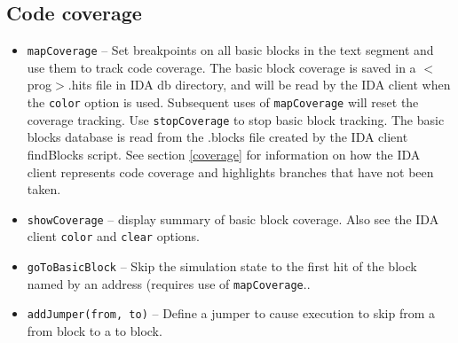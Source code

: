 \documentclass[titlepage]{article}
\begin{document}
\subsection{Code coverage}
\begin{itemize}
\item {\tt mapCoverage} -- Set breakpoints on all basic blocks in the text segment and use them to track code coverage. The basic block coverage is
saved in a $<$prog$>$.hits file in IDA db directory, and will be read by the IDA client when the {\tt color} option is used. Subsequent uses of {\tt mapCoverage}
will reset the coverage tracking.  Use {\tt stopCoverage} to stop basic block tracking.  The basic blocks database is read from the .blocks file created
by the IDA client findBlocks script.  See section \ref{coverage} for information on how the IDA client represents code coverage and highlights
branches that have not been taken.

\item {\tt showCoverage} -- display summary of basic block coverage.  Also see the IDA client {\tt color} and {\tt clear} options.

\item{\tt goToBasicBlock} -- Skip the simulation state to the first hit of the block named by an address (requires use of {\tt mapCoverage}..

\item{\tt addJumper(from, to)} -- Define a jumper to cause execution to skip from a from block to a to block.
\end{itemize}
\end{document}
